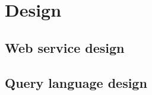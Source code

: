 \chapter{Design}
\label{chap:Design}


\section{Web service design}
\section{Query language design}
